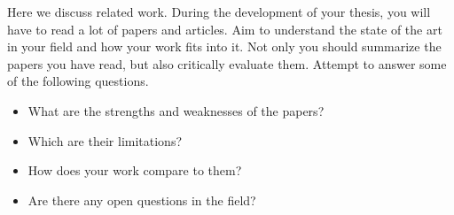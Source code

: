 Here we discuss related work.
During the development of your thesis, you will have to read a lot of papers and articles.
Aim to understand the state of the art in your field and how your work fits into it.
Not only you should summarize the papers you have read, but also critically evaluate them.
Attempt to answer some of the following questions.

\begin{itemize}
    \item What are the strengths and weaknesses of the papers?
    \item Which are their limitations?
    \item How does your work compare to them?
    \item Are there any open questions in the field?
\end{itemize}

\lipsum[4-5]
